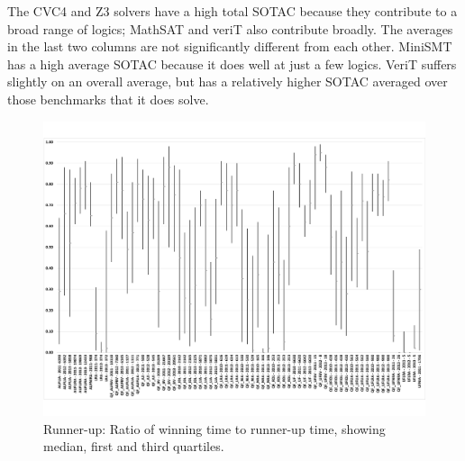 \documentclass[smallcondensed]{svjour3}
\begin{document}
\begin{itemize}
The CVC4 and Z3 solvers have a high total SOTAC because they contribute to a broad range of logics; MathSAT and veriT also contribute broadly. The averages in the last two columns are not significantly different from each other. MiniSMT has a high average SOTAC because it does well at just a few logics. VeriT suffers slightly on an overall average, but has a relatively higher SOTAC averaged over those benchmarks that it does solve.

\end{itemize}

%
%
%

\begin{figure}
\centering
\includegraphics[angle=270,origin=c,width=\columnwidth]{runnerup.pdf}
\caption{Runner-up: Ratio of winning time to runner-up time, showing median, first and third quartiles.}
\label{Fig:runnerup1}
\end{figure}
\end{document}
